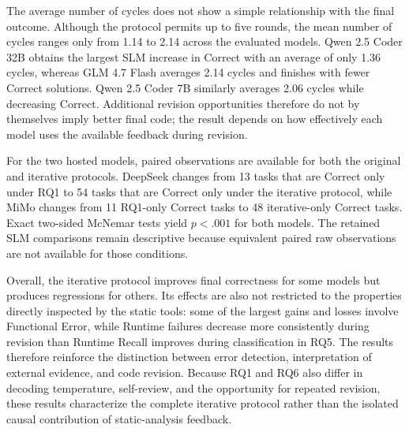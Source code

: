 The average number of cycles does not show a simple relationship with the final outcome. Although the protocol permits up to five rounds, the mean number of cycles ranges only from 1.14 to 2.14 across the evaluated models. Qwen 2.5 Coder 32B obtains the largest SLM increase in Correct with an average of only 1.36 cycles, whereas GLM 4.7 Flash averages 2.14 cycles and finishes with fewer Correct solutions. Qwen 2.5 Coder 7B similarly averages 2.06 cycles while decreasing Correct. Additional revision opportunities therefore do not by themselves imply better final code; the result depends on how effectively each model uses the available feedback during revision.

For the two hosted models, paired observations are available for both the original and iterative protocols. DeepSeek changes from 13 tasks that are Correct only under RQ1 to 54 tasks that are Correct only under the iterative protocol, while MiMo changes from 11 RQ1-only Correct tasks to 48 iterative-only Correct tasks. Exact two-sided McNemar tests yield $p<.001$ for both models. The retained SLM comparisons remain descriptive because equivalent paired raw observations are not available for those conditions.

Overall, the iterative protocol improves final correctness for some models but produces regressions for others. Its effects are also not restricted to the properties directly inspected by the static tools: some of the largest gains and losses involve Functional Error, while Runtime failures decrease more consistently during revision than Runtime Recall improves during classification in RQ5. The results therefore reinforce the distinction between error detection, interpretation of external evidence, and code revision. Because RQ1 and RQ6 also differ in decoding temperature, self-review, and the opportunity for repeated revision, these results characterize the complete iterative protocol rather than the isolated causal contribution of static-analysis feedback.